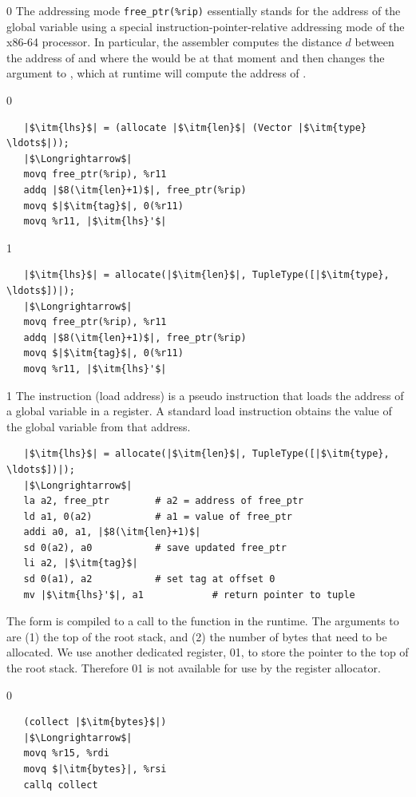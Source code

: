 \documentclass[7x10]{TimesAPriori_MIT}%
\def\racketEd{0}
\def\pythonEd{1}
\def\edition{1}
\def\xeightysixEd{0}
\def\riscvEd{1}
\def\architecture{1}
\newcommand\ifriscv[1]{\if\architecture\riscvEd{#1}\fi}
\newcommand\ifxeightsix[1]{\if\architecture\xeightysixEd{#1}\fi}
\newcommand{\pythonColor}[0]{}
\numberwithin{theorem}{chapter}
\numberwithin{definition}{chapter}
\numberwithin{equation}{chapter}
\begin{document}
{\if\architecture\xeightysixEd
The addressing mode \verb!free_ptr(%rip)! essentially stands for the
address of the  global variable using a special
instruction-pointer-relative addressing mode of the x86-64 processor.
In particular, the assembler computes the distance $d$ between the
address of  and where the  would be at that
moment and then changes the  argument to
, which at runtime will compute the address of
.
%
{\if\edition\racketEd
\begin{lstlisting}
   |$\itm{lhs}$| = (allocate |$\itm{len}$| (Vector |$\itm{type} \ldots$|));
   |$\Longrightarrow$|
   movq free_ptr(%rip), %r11
   addq |$8(\itm{len}+1)$|, free_ptr(%rip)
   movq $|$\itm{tag}$|, 0(%r11)
   movq %r11, |$\itm{lhs}'$|
\end{lstlisting}
\fi}
{\if\edition\pythonEd\pythonColor    
\begin{lstlisting}
   |$\itm{lhs}$| = allocate(|$\itm{len}$|, TupleType([|$\itm{type}, \ldots$])|);
   |$\Longrightarrow$|
   movq free_ptr(%rip), %r11
   addq |$8(\itm{len}+1)$|, free_ptr(%rip)
   movq $|$\itm{tag}$|, 0(%r11)
   movq %r11, |$\itm{lhs}'$|
\end{lstlisting}
  \fi}
\fi}
{\if\architecture\riscvEd
  The instruction  (load address) is a pseudo instruction
  that loads the address of a global variable in a register. A
  standard load instruction obtains the value of the global variable
  from that address. 
\begin{lstlisting}
   |$\itm{lhs}$| = allocate(|$\itm{len}$|, TupleType([|$\itm{type}, \ldots$])|);
   |$\Longrightarrow$|
   la a2, free_ptr        # a2 = address of free_ptr
   ld a1, 0(a2)           # a1 = value of free_ptr
   addi a0, a1, |$8(\itm{len}+1)$|
   sd 0(a2), a0           # save updated free_ptr
   li a2, |$\itm{tag}$|
   sd 0(a1), a2           # set tag at offset 0
   mv |$\itm{lhs}'$|, a1            # return pointer to tuple
\end{lstlisting}
  \fi}
%
The  form is compiled to a call to the 
function in the runtime. The arguments to  are (1) the
top of the root stack, and (2) the number of bytes that need to be
allocated.  We use another dedicated register, \ifxeightsix{}\ifriscv{}, to store
the pointer to the top of the root stack. Therefore \ifxeightsix{}\ifriscv{} is not
available for use by the register allocator.
%
{\if\edition\racketEd
\begin{lstlisting}
   (collect |$\itm{bytes}$|)
   |$\Longrightarrow$|
   movq %r15, %rdi
   movq $|\itm{bytes}|, %rsi
   callq collect
\end{lstlisting}
\fi}
\end{document}
